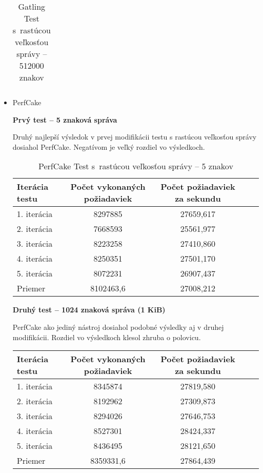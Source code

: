 \documentclass[12pt,oneside,final]{fithesis-utf8}
\begin{document}
\begin{itemize}
\begin{table}[H]
\begin{center}
\begin{tabular}{ | l | c | c | c | c |}
\end{tabular}
\end{center}
\caption{Gatling Test s~rastúcou veľkosťou správy -- 512000 znakov}
\end{table}


\item PerfCake

\textbf{Prvý test -- 5 znaková správa}

Druhý najlepší výsledok v prvej modifikácii testu s rastúcou veľkosťou správy dosiahol PerfCake. Negatívom je veľký rozdiel vo výsledkoch.

\begin{table}[H]
\begin{center}
\begin{tabular}{ | l | c | c | c | c |}
		\hline
		 \textbf{Iterácia testu} & \textbf{Počet vykonaných požiadaviek} & \textbf{Počet požiadaviek za sekundu} \\ \hline
		 1. iterácia & 8297885 & 27659,617 \\ \hline
		 2. iterácia & 7668593 & 25561,977 \\ \hline
		 3. iterácia & 8223258 & 27410,860 \\ \hline
		 4. iterácia & 8250351 & 27501,170 \\ \hline
		 5. iterácia & 8072231 & 26907,437 \\ \hline
		 Priemer & 8102463,6 & 27008,212 \\ \hline
		 
\end{tabular}
\end{center}
\caption{PerfCake Test s~rastúcou veľkosťou správy -- 5 znakov}
\end{table}


\textbf{Druhý test -- 1024 znaková správa (1 KiB)}

PerfCake ako jediný nástroj dosiahol podobné výsledky aj v druhej modifikácii. Rozdiel vo výsledkoch klesol zhruba o polovicu.

\begin{table}[H]
\begin{center}
\begin{tabular}{ | l | c | c | c | c |}
		\hline
		 \textbf{Iterácia testu} & \textbf{Počet vykonaných požiadaviek} & \textbf{Počet požiadaviek za sekundu} \\ \hline
		 1. iterácia & 8345874 & 27819,580 \\ \hline
		 2. iterácia & 8192962 & 27309,873 \\ \hline
		 3. iterácia & 8294026 & 27646,753 \\ \hline
		 4. iterácia & 8527301 & 28424,337 \\ \hline
		 5. iterácia & 8436495 & 28121,650 \\ \hline
		 Priemer & 8359331,6 & 27864,439 \\ \hline
		 

\end{tabular}
\end{center}
\end{table}
\end{itemize}
\end{document}
